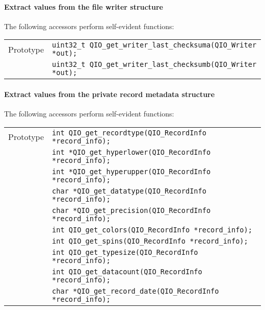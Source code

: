 \documentclass{article}
\begin{document}
\paragraph{Extract values from the file writer structure}
The following accessors perform self-evident functions:
%
%
\begin{flushleft}
  \begin{tabular}{|l|l|}
  \hline
  Prototype      & \verb|uint32_t QIO_get_writer_last_checksuma(QIO_Writer *out);| \\
                 & \verb|uint32_t QIO_get_writer_last_checksumb(QIO_Writer *out);| \\
\hline
 \end{tabular}
\end{flushleft}

\paragraph{Extract values from the private record metadata structure}
The following accessors perform self-evident functions:
%
%
\begin{flushleft}
  \begin{tabular}{|l|l|}
  \hline
  Prototype      & \verb|int QIO_get_recordtype(QIO_RecordInfo *record_info);| \\
                 & \verb|int *QIO_get_hyperlower(QIO_RecordInfo *record_info);| \\
                 & \verb|int *QIO_get_hyperupper(QIO_RecordInfo *record_info);| \\
                 & \verb|char *QIO_get_datatype(QIO_RecordInfo *record_info);| \\
                 & \verb|char *QIO_get_precision(QIO_RecordInfo *record_info);| \\
                 & \verb|int QIO_get_colors(QIO_RecordInfo *record_info);| \\
                 & \verb|int QIO_get_spins(QIO_RecordInfo *record_info);| \\
                 & \verb|int QIO_get_typesize(QIO_RecordInfo *record_info);| \\
                 & \verb|int QIO_get_datacount(QIO_RecordInfo *record_info);| \\
                 & \verb|char *QIO_get_record_date(QIO_RecordInfo *record_info);| \\
\hline
 \end{tabular}
\end{flushleft}
\end{document}

